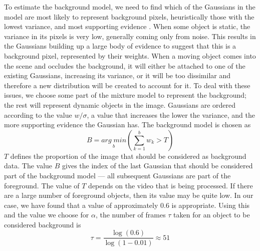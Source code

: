 \documentclass[conference]{IEEEtran}
\begin{document}
To estimate the background model, we need to find which of the Gaussians in the
model are most likely to represent background pixels, heuristically those with
the lowest variance, and most supporting evidence
\cite{stauffer1999adaptive}. When some object is static, the variance in its
pixels is very low, generally coming only from noise. This results in the
Gaussians building up a large body of evidence to suggest that this is a
background pixel, represented by their weights. When a moving object comes into
the scene and occludes the background, it will either be attached to one of the
existing Gaussians, increasing its variance, or it will be too dissimilar and
therefore a new distribution will be created to account for it. To deal with
these issues, we choose some part of the mixture model to represent the
background; the rest will represent dynamic objects in the image. Gaussians are
ordered according to the value $w/\sigma$, a value that increases the lower the
variance, and the more supporting evidence the Gaussian has. The background
model is chosen as
\begin{equation}
  B = \underset{b}{arg\;min}\left(\sum_{k=1}^bw_k>T\right)
\end{equation}
$T$ defines the proportion of the image that should be considered as background
data. The value $B$ gives the index of the last Gaussian that should be
considered part of the background model --- all subsequent Gaussians are part of
the foreground. The value of $T$ depends on the video that is being
processed. If there are a large number of foreground objects, then its value may
be quite low. In our case, we have found that a value of approximately 0.6 is
appropriate. Using this and the value we choose for $\alpha$, the number of
frames $\tau$ taken for an object to be considered background
is~\cite{zivkovic2004improved}
\begin{equation}
  \tau=\frac{\log(0.6)}{\log(1-0.01)}\approx 51
\end{equation}
\end{document}
